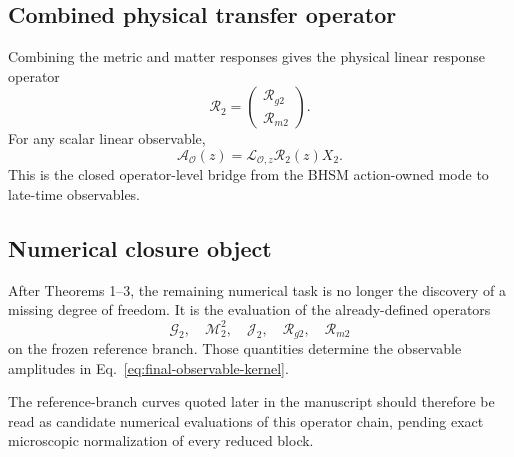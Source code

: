 \subsection{Combined physical transfer operator}

Combining the metric and matter responses gives the physical linear response
operator
\begin{equation}
\boxed{
\mathcal R_2
=
\begin{pmatrix}
\mathcal R_{g2}\\
\mathcal R_{m2}
\end{pmatrix}.
}
\label{eq:combined-R2}
\end{equation}
For any scalar linear observable,
\begin{equation}
\boxed{
\mathcal A_{\mathcal O}(z)
=
\mathcal L_{\mathcal O,z}
\mathcal R_2(z)X_2 .
}
\label{eq:final-observable-kernel}
\end{equation}
This is the closed operator-level bridge from the BHSM action-owned mode to
late-time observables.

\subsection{Numerical closure object}

After Theorems 1--3, the remaining numerical task is no longer the discovery
of a missing degree of freedom.  It is the evaluation of the already-defined
operators
\begin{equation}
\mathcal G_2,\quad
\mathcal M_2^2,\quad
\mathcal J_2,\quad
\mathcal R_{g2},\quad
\mathcal R_{m2}
\end{equation}
on the frozen reference branch.  Those quantities determine the observable
amplitudes in Eq.~\eqref{eq:final-observable-kernel}.

The reference-branch curves quoted later in the manuscript should therefore be
read as candidate numerical evaluations of this operator chain, pending exact
microscopic normalization of every reduced block.
